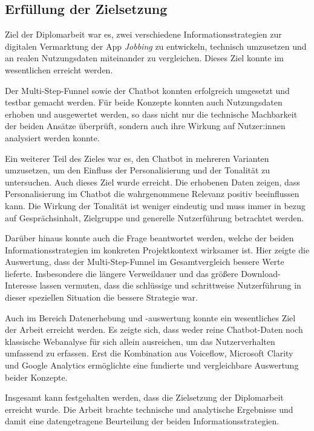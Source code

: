 \setauthor{\secondauthor}
\subsection{Erfüllung der Zielsetzung}

Ziel der Diplomarbeit war es, zwei verschiedene Informationsstrategien zur 
digitalen Vermarktung der App \textit{Jobbing} zu entwickeln, technisch umzusetzen und 
an realen Nutzungsdaten miteinander zu vergleichen. Dieses Ziel konnte im wesentlichen erreicht werden.

Der Multi-Step-Funnel sowie der Chatbot konnten erfolgreich umgesetzt und 
testbar gemacht werden. Für beide Konzepte konnten auch Nutzungsdaten erhoben 
und ausgewertet werden, so dass nicht nur die technische Machbarkeit der beiden 
Ansätze überprüft, sondern auch ihre Wirkung auf Nutzer:innen analysiert werden konnte.

Ein weiterer Teil des Zieles war es, den Chatbot in mehreren Varianten 
umzusetzen, um den Einfluss der Personalisierung und der Tonalität zu 
untersuchen. Auch dieses Ziel wurde erreicht. Die erhobenen Daten zeigen, dass 
Personalisierung im Chatbot die wahrgenommene Relevanz positiv beeinflussen kann.
Die Wirkung der Tonalität ist weniger eindeutig und muss immer in bezug auf 
Gesprächsinhalt, Zielgruppe und generelle Nutzerführung betrachtet werden.

Darüber hinaus konnte auch die Frage beantwortet werden, welche der beiden Informationsstrategien im konkreten Projektkontext wirksamer ist. Hier zeigte die Auswertung, dass der Multi-Step-Funnel im Gesamtvergleich bessere Werte lieferte. Insbesondere die längere Verweildauer und das größere Download-Interesse lassen vermuten, dass die schlüssige und schrittweise Nutzerführung in dieser speziellen Situation die bessere Strategie war.

Auch im Bereich Datenerhebung und -auswertung konnte ein wesentliches Ziel der Arbeit erreicht werden. Es zeigte sich, dass weder reine Chatbot-Daten noch klassische Webanalyse für sich allein ausreichen, um das Nutzerverhalten umfassend zu erfassen. Erst die Kombination aus Voiceflow, Microsoft Clarity und Google Analytics ermöglichte eine fundierte und vergleichbare Auswertung beider Konzepte.

Insgesamt kann festgehalten werden, dass die Zielsetzung der Diplomarbeit erreicht wurde. Die Arbeit brachte technische und analytische Ergebnisse und damit eine datengetragene Beurteilung der beiden Informationsstrategien.

